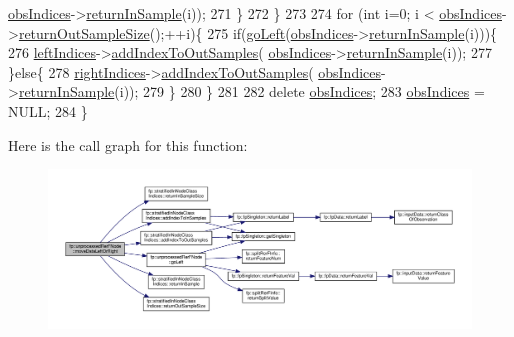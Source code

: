 \begin{DoxyCode}
      \hyperlink{classfp_1_1unprocessedRerFNode_ad52d9d508bf378bc793b8cf961163735}{obsIndices}->\hyperlink{classfp_1_1stratifiedInNodeClassIndices_a2d7e802fb97db0367bb8e8f31d393afd}{returnInSample}(i)); 
271                         \}
272                     \}
273 
274                     \textcolor{keywordflow}{for} (\textcolor{keywordtype}{int} i=0; i < \hyperlink{classfp_1_1unprocessedRerFNode_ad52d9d508bf378bc793b8cf961163735}{obsIndices}->\hyperlink{classfp_1_1stratifiedInNodeClassIndices_a6630b77af340d2023d88bafa87b94cae}{returnOutSampleSize}();++i)\{
275                         \textcolor{keywordflow}{if}(\hyperlink{classfp_1_1unprocessedRerFNode_a4c4e6bb795c327b38301610d0158735a}{goLeft}(\hyperlink{classfp_1_1unprocessedRerFNode_ad52d9d508bf378bc793b8cf961163735}{obsIndices}->\hyperlink{classfp_1_1stratifiedInNodeClassIndices_a2d7e802fb97db0367bb8e8f31d393afd}{returnInSample}(i)))\{
276                             \hyperlink{classfp_1_1unprocessedRerFNode_ae402805c487d29fa6d0b8fb6f873a4d3}{leftIndices}->\hyperlink{classfp_1_1stratifiedInNodeClassIndices_adc99a046031545bc59c2b43abcf75ed9}{addIndexToOutSamples}(
      \hyperlink{classfp_1_1unprocessedRerFNode_ad52d9d508bf378bc793b8cf961163735}{obsIndices}->\hyperlink{classfp_1_1stratifiedInNodeClassIndices_a2d7e802fb97db0367bb8e8f31d393afd}{returnInSample}(i)); 
277                         \}\textcolor{keywordflow}{else}\{
278                             \hyperlink{classfp_1_1unprocessedRerFNode_a4cc97ffcfe51937766fed926bbc4892a}{rightIndices}->\hyperlink{classfp_1_1stratifiedInNodeClassIndices_adc99a046031545bc59c2b43abcf75ed9}{addIndexToOutSamples}(
      \hyperlink{classfp_1_1unprocessedRerFNode_ad52d9d508bf378bc793b8cf961163735}{obsIndices}->\hyperlink{classfp_1_1stratifiedInNodeClassIndices_a2d7e802fb97db0367bb8e8f31d393afd}{returnInSample}(i)); 
279                         \}
280                     \}
281 
282                     \textcolor{keyword}{delete} \hyperlink{classfp_1_1unprocessedRerFNode_ad52d9d508bf378bc793b8cf961163735}{obsIndices};
283                     \hyperlink{classfp_1_1unprocessedRerFNode_ad52d9d508bf378bc793b8cf961163735}{obsIndices} = NULL;
284                 \}
\end{DoxyCode}
Here is the call graph for this function\+:
\nopagebreak
\begin{figure}[H]
\begin{center}
\leavevmode
\includegraphics[width=350pt]{classfp_1_1unprocessedRerFNode_a6b0103f44984a79d6a0871d3e1866b34_cgraph}
\end{center}
\end{figure}

